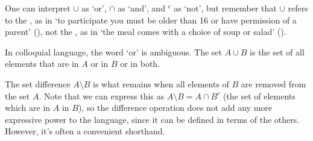 \begin{center}
\begin{minipage}{1.6in}
\begin{center}
\end{center}
\end{minipage}\qquad\begin{minipage}{1.6in}
\begin{center}
\end{center}
\end{minipage}
\end{center}

One can interpret $\cup$ as `or', $\cap$ as `and', and $^{c}$ as `not', but remember that $\cup$ refers to the , as in `to participate you must be older than 16 or have permission of a parent' (), not the , as in `the meal comes with a choice of soup or salad' ().

\begin{warning}
In colloquial language, the word `or' is ambiguous. The set $A \cup B$ is the set of all elements that are in $A$ or in $B$ or in both.
\end{warning}

The set difference $A \setminus B$ is what remains when all elements of $B$ are removed from the set $A$. Note that we can express this as $A \setminus B = A \cap B^c$ (the set of elements which are in $A$   in $B$), so the difference operation does not add any more expressive power to the language, since it can be defined in terms of the others. However, it's often a convenient shorthand.

